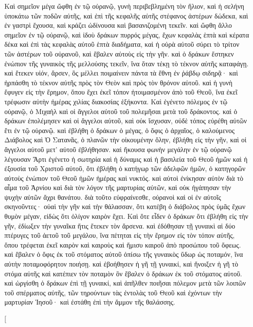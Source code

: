 \begin{pages}
    \begin{Rightside}
        \beginnumbering
		Καὶ σημεῖον μέγα ὤφθη ἐν τῷ οὐρανῷ, γυνὴ περιβεβλημένη τὸν ἥλιον, καὶ ἡ σελήνη ὑποκάτω τῶν ποδῶν αὐτῆς, καὶ ἐπὶ τῆς κεφαλῆς αὐτῆς στέφανος ἀστέρων δώδεκα, καὶ ἐν γαστρὶ ἔχουσα, καὶ κράζει ὠδίνουσα καὶ βασανιζομένη τεκεῖν. 
		\pend
		\pstart
		καὶ ὤφθη ἄλλο σημεῖον ἐν τῷ οὐρανῷ, καὶ ἰδοὺ δράκων πυρρός μέγας, ἔχων κεφαλὰς ἑπτὰ καὶ κέρατα δέκα καὶ ἐπὶ τὰς κεφαλὰς αὐτοῦ ἑπτὰ διαδήματα, καὶ ἡ οὐρὰ αὐτοῦ σύρει τὸ τρίτον τῶν ἀστέρων τοῦ οὐρανοῦ, καὶ ἔβαλεν αὐτοὺς εἰς τὴν γῆν. καὶ ὁ δράκων ἕστηκεν ἐνώπιον τῆς γυναικὸς τῆς μελλούσης τεκεῖν, ἵνα ὅταν τέκῃ τὸ τέκνον αὐτῆς καταφάγῃ. καὶ ἔτεκεν υἱόν, ἄρσεν, ὃς μέλλει ποιμαίνειν πάντα τὰ ἔθνη ἐν ῥάβδῳ σιδηρᾷ· καὶ ἡρπάσθη τὸ τέκνον αὐτῆς πρὸς τὸν Θεὸν καὶ πρὸς τὸν θρόνον αὐτοῦ.
		\pend
		\pstart
		καὶ ἡ γυνὴ ἔφυγεν εἰς τὴν ἔρημον, ὅπου ἔχει ἐκεῖ τόπον ἡτοιμασμένον ἀπὸ τοῦ Θεοῦ, ἵνα ἐκεῖ τρέφωσιν αὐτὴν ἡμέρας χιλίας διακοσίας ἑξήκοντα. Καὶ ἐγένετο πόλεμος ἐν τῷ οὐρανῷ, ὁ Μιχαὴλ καὶ οἱ ἄγγελοι αὐτοῦ τοῦ πολεμῆσαι μετὰ τοῦ δράκοντος. καὶ ὁ δράκων ἐπολέμησεν καὶ οἱ ἄγγελοι αὐτοῦ, καὶ οὐκ ἴσχυσαν, οὐδὲ τόπος εὑρέθη αὐτῶν ἔτι ἐν τῷ οὐρανῷ. 
		\pend
		\pstart
		καὶ ἐβλήθη ὁ δράκων ὁ μέγας, ὁ ὄφις ὁ ἀρχαῖος, ὁ καλούμενος Διάβολος καὶ Ὁ Σατανᾶς, ὁ πλανῶν τὴν οἰκουμένην ὅλην, ἐβλήθη εἰς τὴν γῆν, καὶ οἱ ἄγγελοι αὐτοῦ μετ’ αὐτοῦ ἐβλήθησαν. καὶ ἤκουσα φωνὴν μεγάλην ἐν τῷ οὐρανῷ λέγουσαν Ἄρτι ἐγένετο ἡ σωτηρία καὶ ἡ δύναμις καὶ ἡ βασιλεία τοῦ Θεοῦ ἡμῶν καὶ ἡ ἐξουσία τοῦ 	Χριστοῦ αὐτοῦ, ὅτι ἐβλήθη ὁ κατήγωρ τῶν ἀδελφῶν ἡμῶν, ὁ κατηγορῶν αὐτοὺς ἐνώπιον τοῦ Θεοῦ ἡμῶν ἡμέρας καὶ νυκτός. 
		\pend
		\pstart
		καὶ αὐτοὶ ἐνίκησαν αὐτὸν διὰ τὸ αἷμα τοῦ Ἀρνίου καὶ διὰ τὸν λόγον τῆς μαρτυρίας αὐτῶν, καὶ οὐκ ἠγάπησαν τὴν ψυχὴν αὐτῶν ἄχρι θανάτου. διὰ τοῦτο εὐφραίνεσθε, οὐρανοὶ καὶ οἱ ἐν αὐτοῖς σκηνοῦντες· οὐαὶ τὴν γῆν καὶ τὴν θάλασσαν, ὅτι κατέβη ὁ διάβολος πρὸς ὑμᾶς ἔχων θυμὸν μέγαν, εἰδὼς ὅτι ὀλίγον καιρὸν ἔχει.
		\pend
		\pstart
		Καὶ ὅτε εἶδεν ὁ δράκων ὅτι ἐβλήθη εἰς τὴν γῆν, ἐδίωξεν τὴν γυναῖκα ἥτις ἔτεκεν τὸν ἄρσενα. καὶ ἐδόθησαν τῇ γυναικὶ αἱ δύο πτέρυγες τοῦ ἀετοῦ τοῦ μεγάλου, ἵνα πέτηται εἰς τὴν ἔρημον εἰς τὸν τόπον αὐτῆς, ὅπου τρέφεται ἐκεῖ καιρὸν καὶ καιροὺς καὶ ἥμισυ καιροῦ ἀπὸ προσώπου τοῦ ὄφεως. 
		\pend
		\pstart
		καὶ ἔβαλεν ὁ ὄφις ἐκ τοῦ στόματος αὐτοῦ ὀπίσω τῆς γυναικὸς ὕδωρ ὡς ποταμόν, ἵνα αὐτὴν ποταμοφόρητον ποιήσῃ. καὶ ἐβοήθησεν ἡ γῆ τῇ γυναικί, καὶ ἤνοιξεν ἡ γῆ τὸ στόμα αὐτῆς καὶ κατέπιεν τὸν ποταμὸν ὃν ἔβαλεν ὁ δράκων ἐκ τοῦ στόματος αὐτοῦ. 
		\pend
		\pstart
		καὶ ὠργίσθη ὁ δράκων ἐπὶ τῇ γυναικί, καὶ ἀπῆλθεν ποιῆσαι πόλεμον μετὰ τῶν λοιπῶν τοῦ σπέρματος αὐτῆς, τῶν τηρούντων τὰς ἐντολὰς τοῦ Θεοῦ καὶ ἐχόντων τὴν μαρτυρίαν Ἰησοῦ· καὶ ἐστάθη ἐπὶ τὴν ἄμμον τῆς θαλάσσης.	
		\pend
        \endnumbering
    \end{Rightside}
    \begin{Leftside}
        \beginnumbering
        \pstart[

\end{Leftside}
\end{pages}
